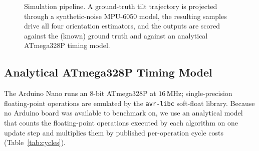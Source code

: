 \documentclass[conference]{IEEEtran}
\newcommand{\bm}[1]{\mathbf{#1}}
\begin{document}
\begin{figure}[t]
\centering
{}
\caption{Simulation pipeline. A ground-truth tilt trajectory is
projected through a synthetic-noise MPU-6050 model, the resulting
samples drive all four orientation estimators, and the outputs
are scored against the (known) ground truth and against an
analytical ATmega328P timing model.}
\label{fig:hw}
\end{figure}

\subsection{Analytical ATmega328P Timing Model}\label{sec:timing}

The Arduino Nano runs an 8-bit ATmega328P at $16\,\mathrm{MHz}$;
single-precision floating-point operations are emulated by the
\texttt{avr-libc} soft-float library. Because no Arduino board
was available to benchmark on, we use an analytical model that
counts the floating-point operations executed by each algorithm
on one update step and multiplies them by published per-operation
cycle costs (Table~\ref{tab:cycles}).
\end{document}
